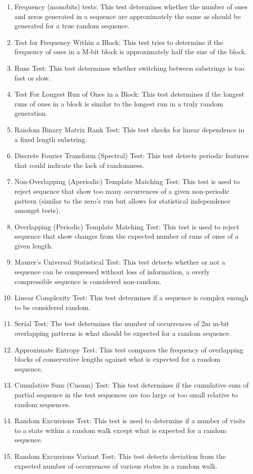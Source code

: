 \documentclass[11pt,letterpaper,conference]{IEEEtran}
\begin{document}
\begin{enumerate}
\item Frequency (monobits) tests: This test determines whether the number of ones and zeros generated in a sequence are approximately the same as should be generated for a true random sequence.
\item Test for Frequency Within a Block: This test tries to determine if the frequency of ones in a M-bit block is approximately half the size of the block.
\item Runs Test: This test determines whether switching between substrings is too fast or slow.
\item Test For Longest Run of Ones in a Block: This test determines if the longest runs of ones in a block is similar to the longest run in a truly random generation.
\item Random Binary Matrix Rank Test: This test checks for linear dependence in a fixed length substring.
\item Discrete Fourier Transform (Spectral) Test: This test detects periodic features that could indicate the lack of randomness.
\item Non-Overlapping (Aperiodic) Template Matching Test: This test is used to reject sequence that show too many occurrences of a given non-periodic pattern (similar to the zero’s run but allows for statistical independence amongst tests).
\item Overlapping (Periodic) Template Matching Test: This test is used to reject sequence that show changes from the expected number of runs of ones of a given length.
\item Maurer's Universal Statistical Test: This test detects whether or not a sequence can be compressed without loss of information, a overly compressible sequence is considered non-random.
\item Linear Complexity Test: This test determines if a sequence is complex enough to be considered random.
\item Serial Test: The test determines the number of occurrences of 2m m-bit overlapping patterns is what should be expected for a random sequence.
\item Approximate Entropy Test: This test compares the frequency of overlapping blocks of conservative lengths against what is expected for a random sequence.
\item Cumulative Sum (Cusum) Test: This test determines if the cumulative sum of partial sequence in the test sequences are too large or too small relative to random sequences.
\item Random Excursions Test: This test is used to determine if a number of visits to a state within a random walk except what is expected for a random sequence.
\item Random Excursions Variant Test: This test detects deviation from the expected number of occurrences of various states in a random walk.
\end{enumerate}
\end{document}
